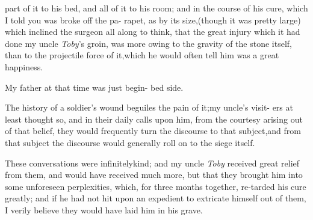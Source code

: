 \documentclass{article}
\begin{document}
\noindent
{}
part of it to his bed, and all of it to his 
room; and in the course of his cure,\break
{}
which I told you was broke off the pa-
rapet,\tsk
as by its size,\tsk (though it was pretty large) which inclined
the surgeon all along to think, that the great injury which it
had done my uncle \textit{Toby}’s groin, was more owing to the
gravity of the stone itself, than to the projectile force of
it,\tsk which he would often tell him was a great happiness.

My father at that time was just begin-
bed side.

The history of a soldier’s wound beguiles the pain of
it;\tsk my uncle’s visit-\break
ers at least thought so, and in their daily\break
calls upon him, from the courtesy arising\break
out of that belief, they would frequently\break
turn the discourse to that subject,\tsk and\break
from that subject the discourse would\break
generally roll on to the siege itself.

These conversations were infinitely\break kind; and my uncle
\textit{Toby} received great relief from them, and would have
recei\-ved much more, but that they brought him into some unforeseen
perplexities, which, for three months together, re-\break tarded his
cure greatly; and if he had not hit upon an
expedient to extricate himself out of them, I verily believe they
would have laid him in his grave.
\end{document}
